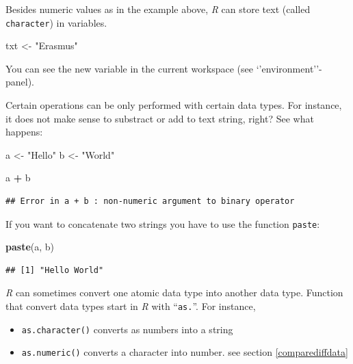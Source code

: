 \documentclass[
]{scrartcl}
\makeatletter
\newenvironment{Shaded}{\begin{snugshade}}{\end{snugshade}}
\newcommand{\FunctionTok}[1]{\textcolor[rgb]{0.13,0.29,0.53}{\textbf{#1}}}
\newcommand{\NormalTok}[1]{#1}
\newcommand{\OtherTok}[1]{\textcolor[rgb]{0.56,0.35,0.01}{#1}}
\newcommand{\SpecialCharTok}[1]{\textcolor[rgb]{0.81,0.36,0.00}{\textbf{#1}}}
\newcommand{\StringTok}[1]{\textcolor[rgb]{0.31,0.60,0.02}{#1}}
\providecommand{\tightlist}{%
  \setlength{\itemsep}{0pt}\setlength{\parskip}{0pt}}
\newenvironment{kframe}{%
\medskip{}
\setlength{\fboxsep}{.8em}
 \def\at@end@of@kframe{}%
 \ifinner\ifhmode%
  \def\at@end@of@kframe{\end{minipage}}%
  \begin{minipage}{\columnwidth}%
 \fi\fi%
 \def\FrameCommand##1{\hskip\@totalleftmargin \hskip-\fboxsep
 \colorbox{shadecolor}{##1}\hskip-\fboxsep
     \hskip-\linewidth \hskip-\@totalleftmargin \hskip\columnwidth}%
 \MakeFramed {\advance\hsize-\width
   \@totalleftmargin\z@ \linewidth\hsize
   \@setminipage}}%
 {\par\unskip\endMakeFramed%
 \at@end@of@kframe}
\newenvironment{rmdblock}[1]
  {
  \begin{itemize}
  \renewcommand{\labelitemi}{
    \raisebox{-.7\height}[0pt][0pt]{
      {\setkeys{Gin}{width=3em,keepaspectratio}\texttt{[image: images/\#1]}}
    }
  }
  \setlength{\fboxsep}{1em}
  \begin{kframe}
  \item
  }
  {
  \end{kframe}
  \end{itemize}
  }
\newenvironment{important}
    {\begin{rmdblock}{hint}}
    {\end{rmdblock}}
\makeatother
\begin{document}
Besides numeric values as in the example above, \emph{R} can store text (called \texttt{character}) in variables.

\begin{Shaded}
\begin{Highlighting}[]
\NormalTok{txt }\OtherTok{\textless{}{-}} \StringTok{"Erasmus"}
\end{Highlighting}
\end{Shaded}

You can see the new variable in the current workspace (see `'environment''-panel).

Certain operations can be only performed with certain data types. For instance,
it does not make sense to substract or add to text string, right? See what happens:

\begin{Shaded}
\begin{Highlighting}[]
\NormalTok{a }\OtherTok{\textless{}{-}} \StringTok{"Hello"}
\NormalTok{b }\OtherTok{\textless{}{-}} \StringTok{"World"}
\end{Highlighting}
\end{Shaded}

\begin{Shaded}
\begin{Highlighting}[]
\NormalTok{a }\SpecialCharTok{+}\NormalTok{ b}
\end{Highlighting}
\end{Shaded}

\begin{verbatim}
## Error in a + b : non-numeric argument to binary operator
\end{verbatim}

If you want to concatenate two strings you have to use the function \texttt{paste}:

\begin{Shaded}
\begin{Highlighting}[]
\FunctionTok{paste}\NormalTok{(a, b)}
\end{Highlighting}
\end{Shaded}

\begin{verbatim}
## [1] "Hello World"
\end{verbatim}

\begin{important}
\emph{R} can sometimes convert one atomic data type into another data
type. Function that convert data types start in \emph{R} with
``\texttt{as.}''. For instance,

\begin{itemize}
\tightlist
\item
  \texttt{as.character()} converts as numbers into a string
\item
  \texttt{as.numeric()} converts a character into number. see section
  \ref{comparediffdata}
\end{itemize}
\end{important}
\end{document}
